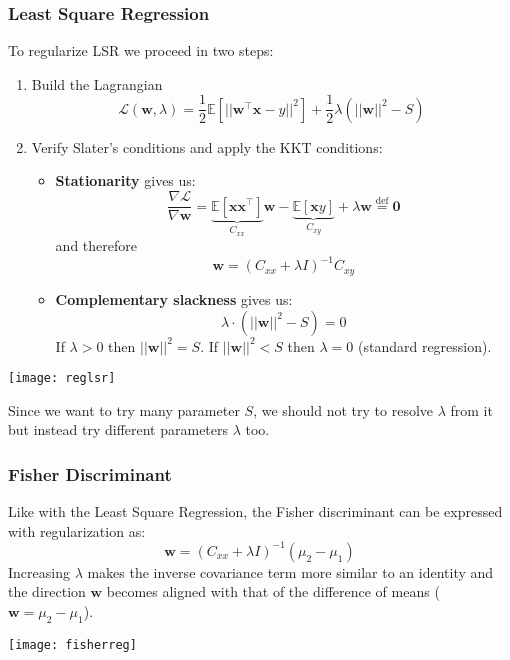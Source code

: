 \subsubsection{Least Square Regression}
To regularize LSR we proceed in two steps:
\begin{enumerate}
	\item Build the Lagrangian
	\begin{equation*}
		\mathcal{L}(\mathbf{w}, \lambda) = \frac{1}{2} \mathbb{E}[\lvert\lvert\mathbf{w}^\top\mathbf{x}-y\rvert\rvert^2] + \frac{1}{2}\lambda(\lvert\lvert \mathbf{w} \rvert\rvert^2-S)
	\end{equation*}
	\newpage
	\item Verify Slater's conditions and apply the KKT conditions:
	\begin{itemize}
		\item \textbf{Stationarity} gives us:
		\begin{equation*}
			\frac{\nabla\mathcal{L}}{\nabla\mathbf{w}} = \underbrace{\mathbb{E}[\mathbf{x}\mathbf{x}^\top]}_{C_{xx}}\mathbf{w} - \underbrace{\mathbb{E}[\mathbf{x}y]}_{C_{xy}} + \lambda\mathbf{w} \overset{\text{def}}{=} \mathbf{0}
		\end{equation*}
		and therefore
		\begin{equation*}
			\mathbf{w} = (C_{xx}+\lambda I)^{-1}C_{xy}
		\end{equation*}
		\item \textbf{Complementary slackness} gives us:
		\begin{equation*}
			\lambda \cdot (\lvert\lvert \mathbf{w}\rvert\rvert^2 - S) = 0
		\end{equation*}
		If $\lambda > 0$ then $\lvert\lvert \mathbf{w}\rvert\rvert^2=S$. If $\lvert\lvert \mathbf{w}\rvert\rvert^2<S$ then $\lambda=0$ (standard regression).
	\end{itemize}
\end{enumerate}

\begin{center}
	\texttt{[image: reglsr]}
\end{center}

\begin{observation}
	Since we want to try many parameter $S$, we should not try to resolve $\lambda$ from it but instead try different parameters $\lambda$ too.
\end{observation}

\subsubsection{Fisher Discriminant}
Like with the Least Square Regression, the Fisher discriminant can be expressed with regularization as:
\begin{equation*}
	\mathbf{w} = (C_{xx}+\lambda I)^{-1}(\mu_2 - \mu_1)
\end{equation*}
Increasing $\lambda$ makes the inverse covariance term more similar to an identity and the direction $\mathbf{w}$ becomes aligned with that of the difference of means ($\mathbf{w} = \mu_2-\mu_1$).
\begin{center}
	\texttt{[image: fisherreg]}
\end{center}


